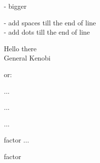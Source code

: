 \code{~ \ \quad \qquad} - bigger\\

\noindent
\code{\vfill} - add spaces till the end of line\\
\code{\dotfill} - add dots till the end of line\\

\begin{example}
Hello \hfill there\\
General \dotfill Kenobi
\end{example}


\begin{latex}
\linespread{1.3} %
\linespread{1.6} %
\end{latex}
or:
\begin{latex}
\singlespacing
\doublespacing

\begin{singlespace}  ...\end{singlespace}
\begin{doublespace}  ...\end{doublespace}
\begin{onehalfspace}  ...\end{onehalfspace}
\begin{spacing}{factor}  ...\end{spacing}{factor}

\end{latex}

